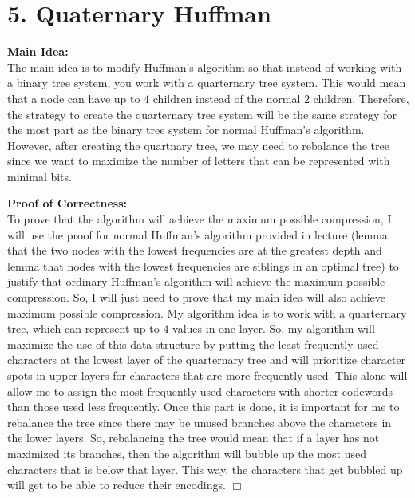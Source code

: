 \documentclass[11pt]{article}
\def\endproofmark{$\Box$}
\newenvironment{mainIdea}{\par{\bf Main Idea:}}{\smallskip}
\newenvironment{proofOfCorrectness}{\par{\bf Proof of Correctness:}}{\endproofmark\smallskip}
\begin{document}
\section*{5. Quaternary Huffman}
\begin{mainIdea}
\\
The main idea is to modify Huffman's algorithm so that instead of working with a binary tree system, you work with a quarternary tree system. This would mean that a node can have up to $4$ children instead of the normal $2$ children. Therefore, the strategy to create the quarternary tree system will be the same strategy for the most part as the binary tree system for normal Huffman's algorithm. However, after creating the quartnary tree, we may need to rebalance the tree since we want to maximize the number of letters that can be represented with minimal bits.
\end{mainIdea}
\\
\begin{proofOfCorrectness}
\\
To prove that the algorithm will achieve the maximum possible compression, I will use the proof for normal Huffman's algorithm provided in lecture (lemma that the two nodes with the lowest frequencies are at the greatest depth and lemma that nodes with the lowest frequencies are siblings in an optimal tree) to justify that ordinary Huffman's algorithm will achieve the maximum possible compression. So, I will just need to prove that my main idea will also achieve maximum possible compression. My algorithm idea is to work with a quarternary tree, which can represent up to $4$ values in one layer. So, my algorithm will maximize the use of this data structure by putting the least frequently used characters at the lowest layer of the quarternary tree and will prioritize character spots in upper layers for characters that are more frequently used. This alone will allow me to assign the most frequently used characters with shorter codewords than those used less frequently. Once this part is done, it is important for me to rebalance the tree since there may be unused branches above the characters in the lower layers. So, rebalancing the tree would mean that if a layer has not maximized its branches, then the algorithm will bubble up the most used characters that is below that layer. This way, the characters that get bubbled up will get to be able to reduce their encodings. 
\end{proofOfCorrectness}
\end{document}
